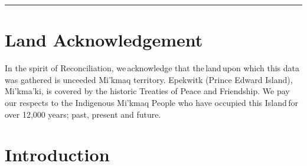 \documentclass[
  letterpaper,
  DIV=11,
  numbers=noendperiod,
  oneside]{scrartcl}
\begin{document}
\begin{center}\rule{0.5\linewidth}{0.5pt}\end{center}

\hypertarget{land-acknowledgement}{%
\section{Land Acknowledgement}\label{land-acknowledgement}}

In the spirit of Reconciliation, we\,acknowledge that the\,land\,upon
which this data was gathered is unceeded Mi'kmaq territory. Epekwitk
(Prince Edward Island), Mi'kma'ki, is covered by the historic Treaties
of Peace and Friendship. We pay our respects to the Indigenous Mi'kmaq
People who have occupied this Island\,for over 12,000 years; past,
present and future.

\hypertarget{introduction}{%
\section{Introduction}\label{introduction}}
\end{document}
